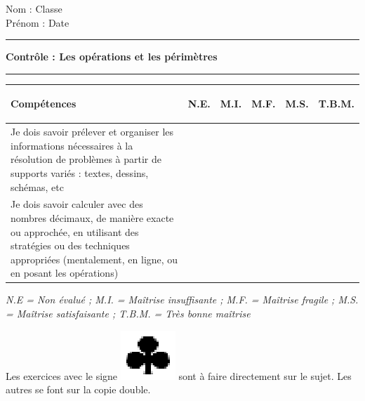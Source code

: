 \documentclass[a4paper,11pt]{article}
\newcommand{\titre}[5] 
{
\noindent #2 \hfill #4 \\
#3 \hfill #5

\vspace{-1.6cm}

\begin{center}\rule{6cm}{0.5mm}\end{center}
\vspace{0.2cm}
\begin{center}{\large{\textbf{#1}}}\end{center}
\begin{center}\rule{6cm}{0.5mm}\end{center}
}
\begin{document}
\pagestyle{empty}
\titre{Contrôle : Les opérations et les périmètres }{Nom :}{Prénom :}{Classe}{Date}

\vspace*{0.25cm}
\begin{flushleft}
\begin{tabular}{|m{9.5cm}|m{1.25cm}|m{1.25cm}|m{1.25cm}|m{1.25cm}|m{1.25cm}|}
\hline 
\textbf{Compétences} & \begin{center}
\textbf{N.E.}
\end{center} & \begin{center}
\textbf{M.I.}
\end{center} & \begin{center}
\textbf{M.F.}
\end{center}  & \begin{center}
\textbf{M.S.}
\end{center} & \begin{center}
\textbf{T.B.M.}
\end{center} \\ 
\hline 
Je dois savoir prélever et organiser les informations nécessaires à la résolution de problèmes à partir de supports variés : textes, dessins, schémas, etc & & &  & &\\
\hline
Je dois savoir calculer avec des nombres décimaux, de manière exacte ou approchée, en utilisant des stratégies ou des techniques appropriées (mentalement, en ligne, ou en posant les opérations) & & &  & & \\ 
\hline 


\end{tabular}  
\end{flushleft}

\textit{N.E = Non évalué ; M.I. = Maîtrise insuffisante ; M.F. = Maîtrise fragile ; M.S. = Maîtrise satisfaisante ; T.B.M. = Très bonne maîtrise}\\

\vspace*{0.5cm}





Les exercices avec le signe  \includegraphics[scale=0.3]{trefle.eps} sont à faire directement sur le sujet. Les autres se font sur la copie double.\\
\end{document}
